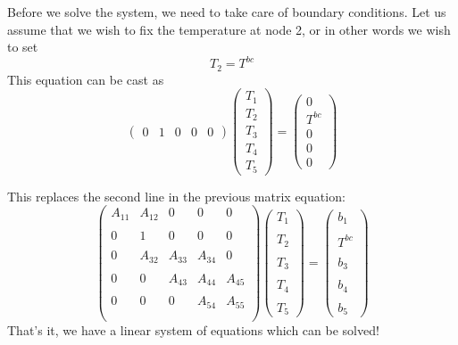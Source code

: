 Before we solve the system, we need to take care of boundary conditions.
Let us assume that we wish to fix the temperature at node 2, or in other words 
we wish to set 
\[
T_2 = T^{bc}
\]
This equation can be cast as
\[
\left(
\begin{array}{ccccc}
 0 & 1 & 0 & 0 & 0
\end{array}
\right)
\left(
\begin{array}{c}
T_1 \\ T_2 \\ T_3 \\ T_4 \\ T_5
\end{array}
\right)
=
\left(
\begin{array}{c}
0 \\
T^{bc} \\
0 \\
0 \\
0
\end{array}
\right)
\]

This replaces the second line in the previous matrix equation:
\[
\left(
\begin{array}{ccccc}
A_{11} & A_{12} & 0& 0& 0\\ \\
0 & 1 & 0 & 0 & 0 \\ \\
0 & A_{32} & A_{33}&  A_{34} & 0 \\\\
0&0&   A_{43} & A_{44}&  A_{45} \\\\
0&0&0   & A_{54}&  A_{55} \\\\
\end{array}
\right)
\left(
\begin{array}{c}
T_1 \\\\ T_2 \\\\ T_3 \\\\ T_4 \\\\ T_5
\end{array}
\right)
=
\left(
\begin{array}{c}
b_{1} \\ \\
T^{bc} \\ \\
b_{3}\\\\
b_{4}\\\\
b_{5}
\end{array}
\right)
\]
That's it, we have a linear system of equations which can be solved!






